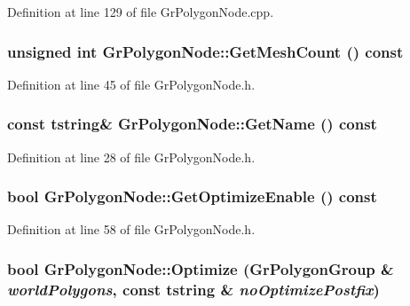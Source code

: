 Definition at line 129 of file GrPolygonNode.cpp.\hypertarget{class_gr_polygon_node_410f7e5c06508726df3f19bfe2754473}{
\subsubsection[{GetMeshCount}]{\setlength{\rightskip}{0pt plus 5cm}unsigned int GrPolygonNode::GetMeshCount () const}}
\label{class_gr_polygon_node_410f7e5c06508726df3f19bfe2754473}




Definition at line 45 of file GrPolygonNode.h.\hypertarget{class_gr_polygon_node_716df79755b048ff14d3c1ee293f068e}{
\subsubsection[{GetName}]{\setlength{\rightskip}{0pt plus 5cm}const {\bf tstring}\& GrPolygonNode::GetName () const}}
\label{class_gr_polygon_node_716df79755b048ff14d3c1ee293f068e}




Definition at line 28 of file GrPolygonNode.h.\hypertarget{class_gr_polygon_node_b6c5f43907f4c5fc89ce5cb62df76538}{
\subsubsection[{GetOptimizeEnable}]{\setlength{\rightskip}{0pt plus 5cm}bool GrPolygonNode::GetOptimizeEnable () const}}
\label{class_gr_polygon_node_b6c5f43907f4c5fc89ce5cb62df76538}




Definition at line 58 of file GrPolygonNode.h.\hypertarget{class_gr_polygon_node_742f1c54d6865a59163e541fb4e84483}{
\subsubsection[{Optimize}]{\setlength{\rightskip}{0pt plus 5cm}bool GrPolygonNode::Optimize ({\bf GrPolygonGroup} \& {\em worldPolygons}, \/  const {\bf tstring} \& {\em noOptimizePostfix})}}
\label{class_gr_polygon_node_742f1c54d6865a59163e541fb4e84483}





